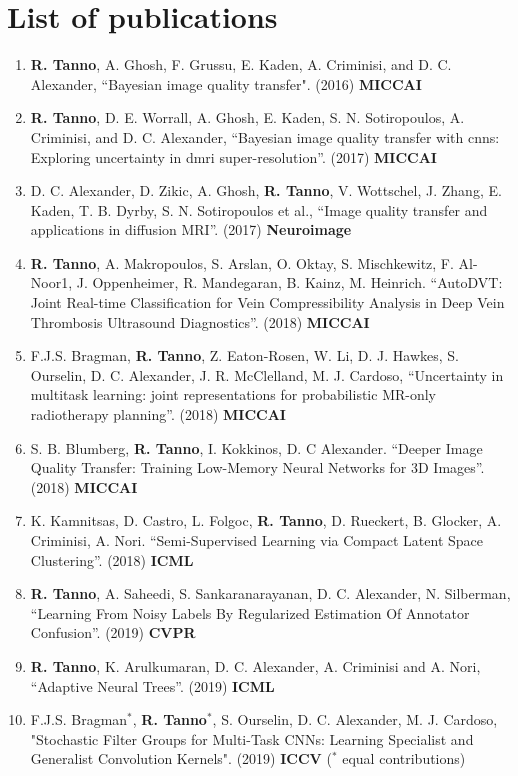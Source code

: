 \section*{List of publications}
\small
\begin{enumerate}
	\item \textbf{R. Tanno}, A. Ghosh, F. Grussu, E. Kaden, A. Criminisi, and D. C. Alexander, “Bayesian image quality transfer". (2016) \textbf{MICCAI}
	
	\item \textbf{R. Tanno}, D. E. Worrall, A. Ghosh, E. Kaden, S. N. Sotiropoulos, A. Criminisi, and D. C. Alexander, “Bayesian image quality transfer with cnns: Exploring uncertainty in dmri super-resolution”. (2017) \textbf{MICCAI}
		
	\item D. C. Alexander, D. Zikic, A. Ghosh, \textbf{R. Tanno}, V. Wottschel, J. Zhang, E. Kaden, T. B. Dyrby, S. N. Sotiropoulos et al., “Image quality transfer and applications in diffusion MRI”.  (2017) \textbf{Neuroimage}
	
	\item \textbf{R. Tanno}, A. Makropoulos, S. Arslan, O. Oktay, S. Mischkewitz, F. Al-Noor1, J. Oppenheimer, R. Mandegaran, B. Kainz, M. Heinrich. “AutoDVT: Joint Real-time Classification for Vein Compressibility Analysis in Deep Vein Thrombosis Ultrasound Diagnostics”. (2018) \textbf{MICCAI}
	
	\item F.J.S. Bragman, \textbf{R. Tanno}, Z. Eaton-Rosen, W. Li, D. J. Hawkes, S. Ourselin, D. C. Alexander, J. R. McClelland, M. J. Cardoso, “Uncertainty in multitask learning: joint representations for probabilistic MR-only radiotherapy planning”. (2018) \textbf{MICCAI}
	
	\item S. B. Blumberg, \textbf{R. Tanno}, I. Kokkinos, D. C Alexander. “Deeper Image Quality Transfer: Training Low-Memory Neural Networks for 3D Images”. (2018) \textbf{MICCAI }
	
	\item K. Kamnitsas, D. Castro, L. Folgoc, \textbf{R. Tanno}, D. Rueckert, B. Glocker, A. Criminisi, A. Nori. “Semi-Supervised Learning via Compact Latent Space Clustering”. (2018) \textbf{ICML}
	
	\item \textbf{R. Tanno}, A. Saheedi, S. Sankaranarayanan, D. C. Alexander, N. Silberman, “Learning From Noisy Labels By Regularized Estimation Of Annotator Confusion”.  (2019) \textbf{CVPR}
	\item \textbf{R. Tanno}, K. Arulkumaran, D. C. Alexander, A. Criminisi and A. Nori,  “Adaptive Neural Trees”.  (2019) \textbf{ICML }
	\item F.J.S. Bragman$^*$, \textbf{R. Tanno}$^*$, S. Ourselin, D. C. Alexander, M. J. Cardoso, "Stochastic Filter Groups for Multi-Task CNNs: Learning Specialist and Generalist Convolution Kernels".  (2019) \textbf{ICCV} ($^*$ equal contributions)
	

\end{enumerate}
